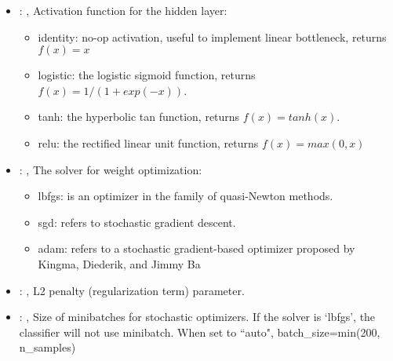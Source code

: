 \begin{itemize}
    \item {}: , 
      Activation function for the hidden layer:
      \begin{itemize}                                                   \item identity:  no-op
      activation, useful to implement linear bottleneck, returns $f(x) = x$
      \item logistic: the logistic sigmoid function, returns $f(x) = 1 / (1 + exp(-x))$.
      \item tanh: the hyperbolic tan function, returns $f(x) = tanh(x)$.
      \item relu:  the rectified linear unit function, returns $f(x) = max(0, x)$
      \end{itemize}

    \item {}: , 
      The solver for weight optimization:
      \begin{itemize}                                                   \item lbfgs: is an optimizer
      in the family of quasi-Newton methods.                                                   \item
      sgd: refers to stochastic gradient descent.
      \item adam: refers to a stochastic gradient-based optimizer proposed by Kingma, Diederik, and
      Jimmy Ba                                                  \end{itemize}

    \item {}: , 
      L2 penalty (regularization term) parameter.

    \item {}: , 
      Size of minibatches for stochastic optimizers. If the solver is `lbfgs',
      the classifier will not use minibatch. When set to ``auto", batch\_size=min(200, n\_samples)


\end{itemize}
